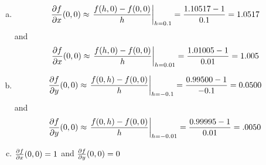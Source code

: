 \begin{answer}
\begin{enumerate}[(a)]
\item
\begin{align*}
\pdiff{f}{x}(0,0)
\approx \left.\frac{f(h,0)-f(0,0)}{h}\right|_{h=0.1}
=\frac{1.10517-1}{0.1}
=1.0517
\end{align*}
and
\begin{align*}
\pdiff{f}{x}(0,0)
\approx \left.\frac{f(h,0)-f(0,0)}{h}\right|_{h=0.01}
=\frac{1.01005-1}{0.01}
=1.005
\end{align*}
\item
\begin{align*}
\pdiff{f}{y}(0,0)
\approx \left.\frac{f(0,h)-f(0,0)}{h}\right|_{h=-0.1}
=\frac{0.99500-1}{-0.1}
=0.0500
\end{align*}
and
\begin{align*}
\pdiff{f}{y}(0,0)
\approx \left.\frac{f(0,h)-f(0,0)}{h}\right|_{h=-0.01}
=\frac{0.99995-1}{0.01}
=.0050
\end{align*}
\item
$
\pdiff{f}{x}(0,0) =1 
$
and
$\pdiff{f}{y}(0,0) = 0
$
\end{enumerate}
\end{answer}

